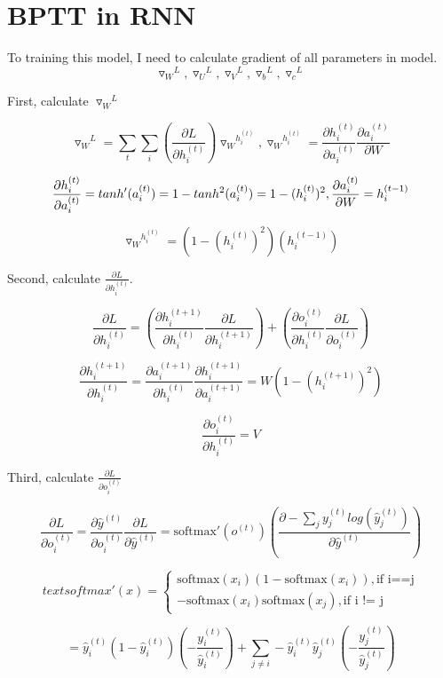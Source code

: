 \documentclass[12pt]{article}
\begin{document}
\section{BPTT in RNN}

To training this model, I need to calculate gradient of all parameters in model.
$$ {\triangledown_W}^L, {\triangledown_U}^L, {\triangledown_V}^L, {\triangledown_b}^L, {\triangledown_c}^L $$

First, calculate ${\triangledown_W}^L$

$$
{\triangledown_W}^L = \sum_t \sum_i (\frac{\partial L}{\partial h_i^{(t)}}) {\triangledown_W}^{h_i^{(t)}}, 
{\triangledown_W}^{h_i^{(t)}} = \frac{\partial h_i^{(t)}}{\partial a_i^{(t)}} \frac{\partial a_i^{(t)}}{\partial W} 
$$

$$
\frac{\partial h_i^{(t)}}{\partial a_i^{(t)}} = tanh'(a_i^{(t)}) = 1 - tanh^2(a_i^{(t)}) = 1 - (h_i^{(t)})^2, \space \frac{\partial a_i^{(t)}}{\partial W} = h_i^{(t-1)}
$$

$$
{\triangledown_W}^{h_i^{(t)}} = (1 - (h_i^{(t)})^2)(h_i^{(t-1)})
$$

Second, calculate $\frac{\partial L}{\partial h_i^{(t)}}$.

$$
\frac{\partial L}{\partial h_i^{(t)}} = (\frac{\partial h_i^{(t+1)}}{\partial h_i^{(t)}} \frac{\partial L}{\partial h_i^{(t+1)}}) + (\frac{\partial o_i^{(t)}}{\partial h_i^{(t)}} \frac{\partial L}{\partial o_i^{(t)}})
$$

$$
\frac{\partial h_i^{(t+1)}}{\partial h_i^{(t)}} = \frac{\partial a_i^{(t+1)}}{\partial h_i^{(t)}} \frac{\partial h_i^{(t+1)}}{\partial a_i^{(t+1)}} = W (1 - (h_i^{(t+1)})^2)
$$

$$
\frac{\partial o_i^{(t)}}{\partial h_i^{(t)}} = V
$$

Third, calculate $\frac{\partial L}{\partial o_i^{(t)}}$

$$
\frac{\partial L}{\partial o_i^{(t)}} = \frac{\partial \hat{y}^{(t)}}{\partial o_i^{(t)}}\frac{\partial L}{\partial \hat{y}^{(t)}} = \text{softmax}'(o^{(t)}) (\frac{\partial - \sum_j y_j^{(t)}log (\hat{y}_j^{(t)})}{\partial \hat{y}^{(t)}})
$$

$$
text{softmax}'(x) = \left\{\begin{array}{ll} \text{softmax}(x_i) (1 - \text{softmax}(x_i)), \text{if i==j} \\ -\text{softmax}(x_i)\text{softmax}(x_j), \text{if i != j}\end{array}\right.
$$

$$
= \hat{y}_i^{(t)}(1 -\hat{y}_i^{(t)}) (-\frac{y_i^{(t)}}{\hat{y}_i^{(t)}}) + \sum_{j\neq i} -\hat{y}_i^{(t)}\hat{y}_j^{(t)} (-\frac{y_j^{(t)}}{\hat{y}_j^{(t)}})
$$
\end{document}
